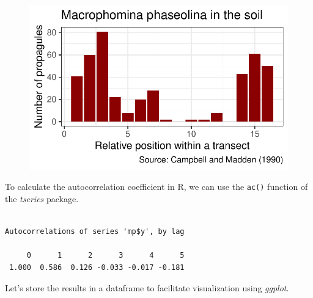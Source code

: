 \documentclass[
  letterpaper,
  DIV=11,
  numbers=noendperiod]{scrreprt}
\newenvironment{Shaded}{\begin{snugshade}}{\end{snugshade}}
\newcommand{\AttributeTok}[1]{\textcolor[rgb]{0.40,0.45,0.13}{#1}}
\newcommand{\ConstantTok}[1]{\textcolor[rgb]{0.56,0.35,0.01}{#1}}
\newcommand{\DecValTok}[1]{\textcolor[rgb]{0.68,0.00,0.00}{#1}}
\newcommand{\FunctionTok}[1]{\textcolor[rgb]{0.28,0.35,0.67}{#1}}
\newcommand{\NormalTok}[1]{\textcolor[rgb]{0.00,0.23,0.31}{#1}}
\newcommand{\OtherTok}[1]{\textcolor[rgb]{0.00,0.23,0.31}{#1}}
\newcommand{\SpecialCharTok}[1]{\textcolor[rgb]{0.37,0.37,0.37}{#1}}
\begin{document}
\begin{figure}[H]

{\centering \includegraphics{./spatial-tests_files/figure-pdf/unnamed-chunk-44-1.pdf}

}

\end{figure}

To calculate the autocorrelation coefficient in R, we can use the
\texttt{ac()} function of the \emph{tseries} package.

\begin{Shaded}
\end{Shaded}

\begin{verbatim}

Autocorrelations of series 'mp$y', by lag

     0      1      2      3      4      5 
 1.000  0.586  0.126 -0.033 -0.017 -0.181 
\end{verbatim}

Let's store the results in a dataframe to facilitate visualization using
\emph{ggplot}.

\begin{Shaded}
\end{Shaded}
\end{document}
